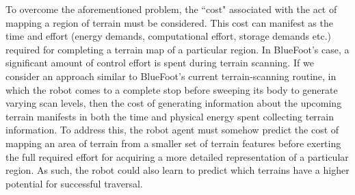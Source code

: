 	To overcome the aforementioned problem, the ``cost" associated with the act of mapping a region of terrain must be considered. This cost can manifest as the time and effort (energy demands, computational effort, storage demands etc.) required for completing a terrain map of a particular region. In BlueFoot's case, a significant amount of control effort is spent during terrain scanning. If we consider an approach similar to BlueFoot's current terrain-scanning routine, in which the robot comes to a complete stop before sweeping its body to generate varying scan levels, then the cost of generating information about the upcoming terrain  manifests in both the time and physical energy spent collecting terrain information. To address this, the robot agent must somehow predict the cost of mapping an area of terrain from a smaller set of terrain features before exerting the full required effort for acquiring a more detailed representation of a particular region. As such, the robot could also learn to predict which terrains have a higher potential for successful traversal. %